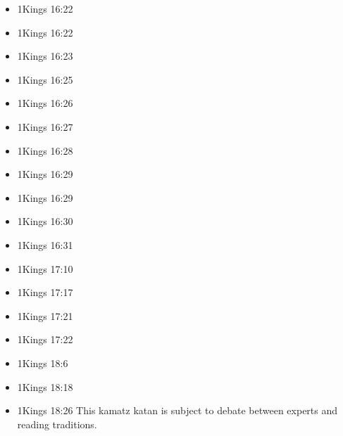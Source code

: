 \documentclass[14pt]{article}
\begin{document}
\begin{multicols}{2}
\begin{itemize}
											\item 1Kings 16:22
											
											\item 1Kings 16:22
											
											\item 1Kings 16:23
											
											\item 1Kings 16:25
											
											\item 1Kings 16:26
											
											\item 1Kings 16:27
											
											\item 1Kings 16:28
											
											\item 1Kings 16:29
											
											\item 1Kings 16:29
											
											\item 1Kings 16:30
											
											\item 1Kings 16:31
											
											\item 1Kings 17:10
											
											\item 1Kings 17:17
											
											\item 1Kings 17:21
											
											\item 1Kings 17:22
											
											\item 1Kings 18:6
											
											\item 1Kings 18:18
											
											\item 1Kings 18:26 This kamatz katan is subject to debate between experts and reading traditions.
											

\end{itemize}
\end{multicols}
\end{document}
